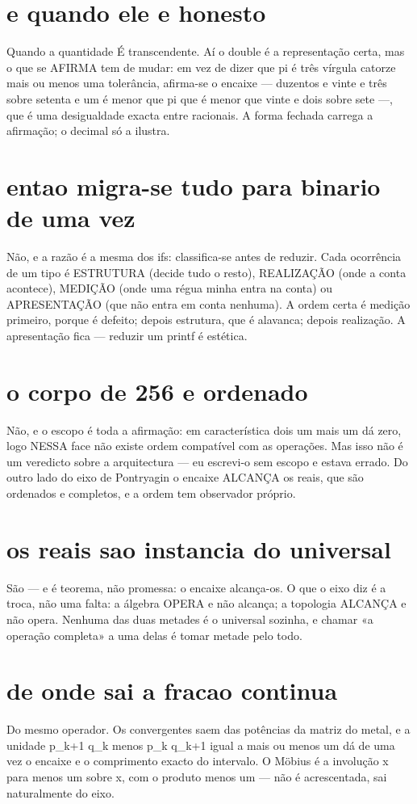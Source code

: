 \documentclass[11pt,a4paper]{article}
\begin{document}
\section{e quando ele e honesto}
Quando a quantidade É transcendente. Aí o double é a representação certa, mas o que se
AFIRMA tem de mudar: em vez de dizer que pi é três vírgula catorze mais ou menos uma
tolerância, afirma-se o encaixe — duzentos e vinte e três sobre setenta e um é menor que pi
que é menor que vinte e dois sobre sete —, que é uma desigualdade exacta entre racionais. A
forma fechada carrega a afirmação; o decimal só a ilustra.

\section{entao migra-se tudo para binario de uma vez}
Não, e a razão é a mesma dos ifs: classifica-se antes de reduzir. Cada ocorrência de um
tipo é ESTRUTURA (decide tudo o resto), REALIZAÇÃO (onde a conta acontece), MEDIÇÃO (onde
uma régua minha entra na conta) ou APRESENTAÇÃO (que não entra em conta nenhuma). A ordem
certa é medição primeiro, porque é defeito; depois estrutura, que é alavanca; depois
realização. A apresentação fica — reduzir um printf é estética.

\section{o corpo de 256 e ordenado}
Não, e o escopo é toda a afirmação: em característica dois um mais um dá zero, logo NESSA
face não existe ordem compatível com as operações. Mas isso não é um veredicto sobre a
arquitectura — eu escrevi-o sem escopo e estava errado. Do outro lado do eixo de
Pontryagin o encaixe ALCANÇA os reais, que são ordenados e completos, e a ordem tem
observador próprio.

\section{os reais sao instancia do universal}
São — e é teorema, não promessa: o encaixe alcança-os. O que o eixo diz é a troca, não uma
falta: a álgebra OPERA e não alcança; a topologia ALCANÇA e não opera. Nenhuma das duas
metades é o universal sozinha, e chamar «a operação completa» a uma delas é tomar metade
pelo todo.

\section{de onde sai a fracao continua}
Do mesmo operador. Os convergentes saem das potências da matriz do metal, e a unidade
p_{k+1} q_k menos p_k q_{k+1} igual a mais ou menos um dá de uma vez o encaixe e o
comprimento exacto do intervalo. O Möbius é a involução x para menos um sobre x, com o
produto menos um — não é acrescentada, sai naturalmente do eixo.
\end{document}
